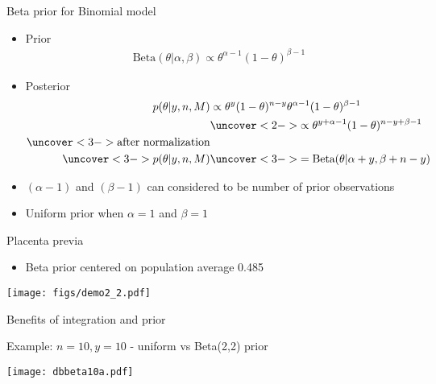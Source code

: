 \documentclass[english,t]{beamer}
\begin{document}
\begin{frame}
{Beta prior for Binomial model}

  \begin{itemize}
  \item Prior \baselineskip
    \begin{align*}
      \text{Beta}(\theta|\alpha,\beta) \propto \theta^{\alpha-1}
      (1-\theta)^{\beta-1}
    \end{align*}
  \item Posterior
    \baselineskip
    \begin{align*}
      p(\theta|y,n,M) & \propto \theta^y(1-\theta)^{n-y}
      \theta^{\alpha-1} (1-\theta)^{\beta-1}\\
      &\uncover<2->{ \propto
        \theta^{y+\alpha-1} (1-\theta)^{n-y+\beta-1}}\\
      \uncover<3->{\text{after normalization}} &\\
      \uncover<3->{p(\theta|y,n,M)}
      &\uncover<3->{ = \text{Beta}(\theta|\alpha+y,\beta+n-y)}
    \end{align*}
    \vskip -2mm
  \item<4-> $(\alpha-1)$ and $(\beta-1)$ can considered to be number of prior observations
  \item<4-> Uniform prior when $\alpha=1$ and $\beta=1$ 
  \end{itemize}
\end{frame}

\begin{frame}{Placenta previa}

  \begin{itemize}
  \item Beta prior centered on population average 0.485
  \end{itemize}
  {\texttt{[image: figs/demo2\_2.pdf]}}
\end{frame}

\begin{frame}{Benefits of integration and prior}

  \vspace{-0.5\baselineskip}
  Example: $n=10, y=10$ - uniform vs Beta(2,2) prior
  \begin{center}
  \texttt{[image: dbbeta10a.pdf]}\\
  \end{center}

\end{frame}
\end{document}
